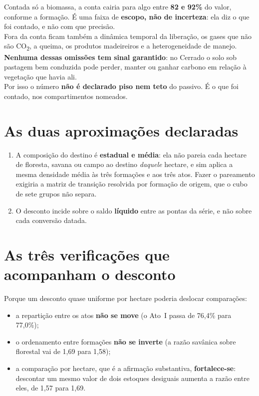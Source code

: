 \begin{naodiz}
Contada só a biomassa, a conta cairia para algo entre \textbf{82 e 92\%} do
valor, conforme a formação. É uma faixa de \textbf{escopo, não de incerteza}:
ela diz o que foi contado, e não com que precisão. \\[4pt]
Fora da conta ficam também a dinâmica temporal da liberação, os gases que não
são CO\textsubscript{2}, a queima, os produtos madeireiros e a heterogeneidade
de manejo. \textbf{Nenhuma dessas omissões tem sinal garantido}: no Cerrado o
solo sob pastagem bem conduzida pode perder, manter ou ganhar carbono em relação
à vegetação que havia ali. \\[4pt]
Por isso o número \textbf{não é declarado piso nem teto} do passivo. É o que foi
contado, nos compartimentos nomeados.
\end{naodiz}

\section{As duas aproximações declaradas}

\begin{enumerate}
\item A composição do destino é \textbf{estadual e média}: ela não pareia cada
hectare de floresta, savana ou campo ao destino \emph{daquele} hectare, e sim
aplica a mesma densidade média às três formações e aos três atos. Fazer o
pareamento exigiria a matriz de transição resolvida por formação de origem, que
o cubo de sete grupos não separa.
\item O desconto incide sobre o saldo \textbf{líquido} entre as pontas da série,
e não sobre cada conversão datada.
\end{enumerate}

\section{As três verificações que acompanham o desconto}

Porque um desconto quase uniforme por hectare poderia deslocar comparações:

\begin{itemize}
\item a repartição entre os atos \textbf{não se move} (o Ato~I passa de 76,4\%
para 77,0\%);
\item o ordenamento entre formações \textbf{não se inverte} (a razão savânica
sobre florestal vai de 1,69 para 1,58);
\item a comparação por hectare, que é a afirmação substantiva,
\textbf{fortalece-se}: descontar um mesmo valor de dois estoques desiguais
aumenta a razão entre eles, de 1,57 para 1,69.
\end{itemize}
